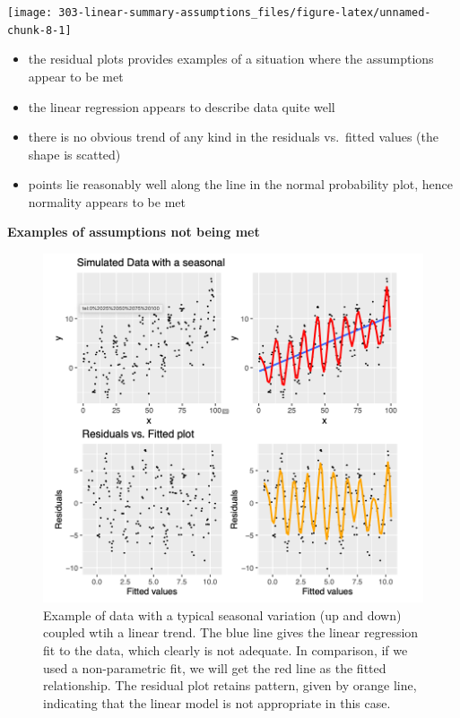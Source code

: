\documentclass[
]{book}
\providecommand{\tightlist}{%
  \setlength{\itemsep}{0pt}\setlength{\parskip}{0pt}}
\theoremstyle{definition}
\theoremstyle{definition}
\theoremstyle{definition}
\theoremstyle{remark}
\begin{document}
\begin{center}\texttt{[image: 303-linear-summary-assumptions\_files/figure-latex/unnamed-chunk-8-1]} \end{center}

\begin{itemize}
\tightlist
\item
  the residual plots provides examples of a situation where the assumptions appear to be met
\item
  the linear regression appears to describe data quite well
\item
  there is no obvious trend of any kind in the residuals vs.~fitted values (the shape is scatted)
\item
  points lie reasonably well along the line in the normal probability plot, hence normality appears to be met
\end{itemize}

\textbf{Examples of assumptions not being met}

\begin{figure}

{\centering \includegraphics{figures/linear-models/lm-assumptions-01} 

}

\caption{Example of data with a typical seasonal variation (up and down) coupled wtih a linear trend. The blue line gives the linear regression fit to the data, which clearly is not adequate. In comparison, if we used a non-parametric fit, we will get the red line as the fitted relationship. The residual plot retains pattern, given by orange line, indicating that the linear model is not appropriate in this case.}\label{fig:lm-viol-01}
\end{figure}
\end{document}
